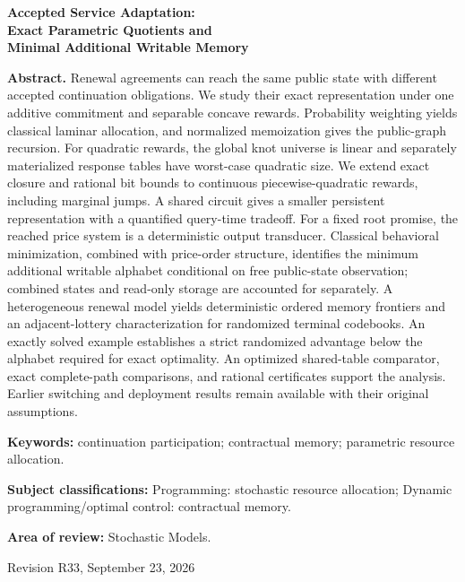 \documentclass[11pt,letterpaper]{article}
\theoremstyle{definition}\newtheorem{assumption}[theorem]{Assumption}
\begin{document}
\hypersetup{pageanchor=false}
\begin{titlepage}\centering
{\Large\bfseries Accepted Service Adaptation:\\ Exact Parametric Quotients and\\ Minimal Additional Writable Memory\par}
\vspace{.35in}{Anonymous manuscript for Operations Research\par}\vspace{.25in}
\begin{minipage}{\textwidth}
\textbf{Abstract.} Renewal agreements can reach the same public state with different accepted continuation obligations. We study their exact representation under one additive commitment and separable concave rewards. Probability weighting yields classical laminar allocation, and normalized memoization gives the public-graph recursion. For quadratic rewards, the global knot universe is linear and separately materialized response tables have worst-case quadratic size. We extend exact closure and rational bit bounds to continuous piecewise-quadratic rewards, including marginal jumps. A shared circuit gives a smaller persistent representation with a quantified query-time tradeoff. For a fixed root promise, the reached price system is a deterministic output transducer. Classical behavioral minimization, combined with price-order structure, identifies the minimum additional writable alphabet conditional on free public-state observation; combined states and read-only storage are accounted for separately. A heterogeneous renewal model yields deterministic ordered memory frontiers and an adjacent-lottery characterization for randomized terminal codebooks. An exactly solved example establishes a strict randomized advantage below the alphabet required for exact optimality. An optimized shared-table comparator, exact complete-path comparisons, and rational certificates support the analysis. Earlier switching and deployment results remain available with their original assumptions.
\par\vspace{.15in}\textbf{Keywords:} continuation participation; contractual memory; parametric resource allocation.
\par\vspace{.1in}\textbf{Subject classifications:} Programming: stochastic resource allocation; Dynamic programming/optimal control: contractual memory.
\par\vspace{.1in}\textbf{Area of review:} Stochastic Models.
\end{minipage}\vfill{Revision R33, September 23, 2026\par}
\end{titlepage}
\end{document}
